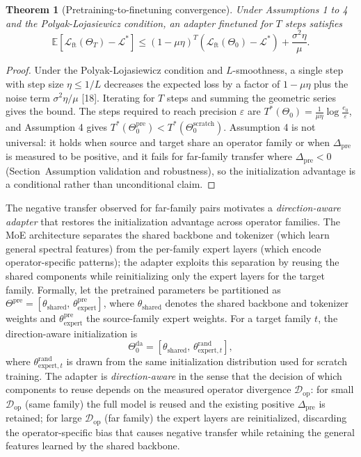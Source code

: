 \documentclass[preprint,12pt]{elsarticle}
\newtheorem{theorem}{Theorem}
\begin{document}
\begin{theorem}[Pretraining-to-finetuning convergence]
Under Assumptions 1 to 4 and the Polyak-Lojasiewicz condition, an adapter finetuned for $T$ steps satisfies
\begin{equation}
\mathbb{E}[\mathcal{L}_{\mathrm{ft}}(\Theta_T)-\mathcal{L}^*]\le(1-\mu\eta)^T(\mathcal{L}_{\mathrm{ft}}(\Theta_0)-\mathcal{L}^*)+\frac{\sigma^2\eta}{\mu}.
\end{equation}
\end{theorem}

\begin{proof}
Under the Polyak-Lojasiewicz condition and $L$-smoothness, a single step with step size $\eta\le 1/L$ decreases the expected loss by a factor of $1-\mu\eta$ plus the noise term $\sigma^2\eta/\mu$ [18]. Iterating for $T$ steps and summing the geometric series gives the bound. The steps required to reach precision $\varepsilon$ are $T^*(\Theta_0)=\frac{1}{\mu\eta}\log\frac{e_0}{\varepsilon}$, and Assumption 4 gives $T^*(\Theta_0^{\mathrm{pre}})<T^*(\Theta_0^{\mathrm{scratch}})$. Assumption 4 is not universal: it holds when source and target share an operator family or when $\Delta_{\mathrm{pre}}$ is measured to be positive, and it fails for far-family transfer where $\Delta_{\mathrm{pre}}<0$ (Section~Assumption validation and robustness), so the initialization advantage is a conditional rather than unconditional claim.
\end{proof}

The negative transfer observed for far-family pairs motivates a \emph{direction-aware adapter} that restores the initialization advantage across operator families. The MoE architecture separates the shared backbone and tokenizer (which learn general spectral features) from the per-family expert layers (which encode operator-specific patterns); the adapter exploits this separation by reusing the shared components while reinitializing only the expert layers for the target family. Formally, let the pretrained parameters be partitioned as $\Theta^{\mathrm{pre}}=[\theta_{\mathrm{shared}},\,\theta^{\mathrm{pre}}_{\mathrm{expert}}]$, where $\theta_{\mathrm{shared}}$ denotes the shared backbone and tokenizer weights and $\theta^{\mathrm{pre}}_{\mathrm{expert}}$ the source-family expert weights. For a target family $t$, the direction-aware initialization is
\begin{equation}
\Theta^{\mathrm{da}}_0=[\theta_{\mathrm{shared}},\,\theta^{\mathrm{rand}}_{\mathrm{expert},t}],
\end{equation}
where $\theta^{\mathrm{rand}}_{\mathrm{expert},t}$ is drawn from the same initialization distribution used for scratch training. The adapter is \emph{direction-aware} in the sense that the decision of which components to reuse depends on the measured operator divergence $\mathcal{D}_{\mathrm{op}}$: for small $\mathcal{D}_{\mathrm{op}}$ (same family) the full model is reused and the existing positive $\Delta_{\mathrm{pre}}$ is retained; for large $\mathcal{D}_{\mathrm{op}}$ (far family) the expert layers are reinitialized, discarding the operator-specific bias that causes negative transfer while retaining the general features learned by the shared backbone.
\end{document}
